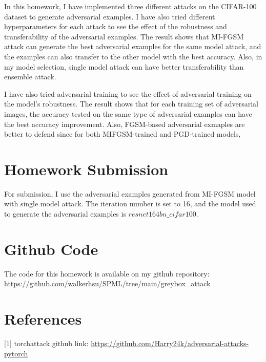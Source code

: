 \documentclass{article}
\begin{document}
In this homework, I have implemented three different attacks on the CIFAR-100 dataset to generate adversarial examples.
I have also tried different hyperparameters for each attack to see the effect of the robustness and transferability of the adversarial examples.
The result shows that MI-FGSM attack can generate the best adversarial examples for the same model attack, and the examples can also transfer to the other model with the best accuracy.
Also, in my model selection, single model attack can have better transferability than ensemble attack.

I have also tried adversarial training to see the effect of adversarial training on the model's robustness.
The result shows that for each training set of adversarial images, the accuracy tested on the same type of adversarial examples can have the best accuracy improvement.
Also, FGSM-based adversarial exmaples are better to defend since for both MIFGSM-trained and PGD-trained models,

\section*{Homework Submission}

For submission, I use the adversarial examples generated from MI-FGSM model with single model attack.
The iteration number is set to 16, and the model used to generate the adversarial examples is $resnet164bn\_cifar100$.

\section*{Github Code}

The code for this homework is available on my github repository: \\
\url{https://github.com/walkerhsu/SPML/tree/main/greybox_attack}

\section*{References}



{
\small


[1] torchattack github link: {\url{https://github.com/Harry24k/adversarial-attacks-pytorch}}

}
\end{document}

